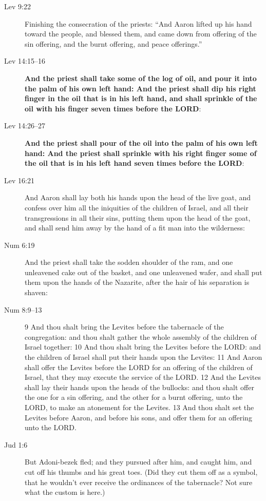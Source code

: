 \begin{description}
			\item[Lev 9:22] Finishing the consecration of the priests: ``And Aaron lifted up his hand toward the people, and blessed them, and came down from offering of the sin offering, and the burnt offering, and peace offerings.''
			\item[Lev 14:15--16] \textbf{And the priest shall take some of the log of oil, and pour it into the palm of his own left hand: And the priest shall dip his right finger in the oil that is in his left hand, and shall sprinkle of the oil with his finger seven times before the LORD}:
			\item[Lev 14:26--27] \textbf{And the priest shall pour of the oil into the palm of his own left hand: And the priest shall sprinkle with his right finger some of the oil that is in his left hand seven times before the LORD}:
			\item[Lev 16:21] And Aaron shall lay both his hands upon the head of the live goat, and confess over him all the iniquities of the children of Israel, and all their transgressions in all their sins, putting them upon the head of the goat, and shall send him away by the hand of a fit man into the wilderness:
			\item[Num 6:19] And the priest shall take the sodden shoulder of the ram, and one unleavened cake out of the basket, and one unleavened wafer, and shall put them upon the hands of the Nazarite, after the hair of his separation is shaven:
			\item[Num 8:9--13] 9 And thou shalt bring the Levites before the tabernacle of the congregation: and thou shalt gather the whole assembly of the children of Israel together: 10 And thou shalt bring the Levites before the LORD: and the children of Israel shall put their hands upon the Levites: 11 And Aaron shall offer the Levites before the LORD for an offering of the children of Israel, that they may execute the service of the LORD. 12 And the Levites shall lay their hands upon the heads of the bullocks: and thou shalt offer the one for a sin offering, and the other for a burnt offering, unto the LORD, to make an atonement for the Levites. 13 And thou shalt set the Levites before Aaron, and before his sons, and offer them for an offering unto the LORD.
			\item[Jud 1:6] But Adoni-bezek fled; and they pursued after him, and caught him, and cut off his thumbs and his great toes. (Did they cut them off as a symbol, that he wouldn't ever receive the ordinances of the tabernacle? Not sure what the custom is here.)

\end{description}
